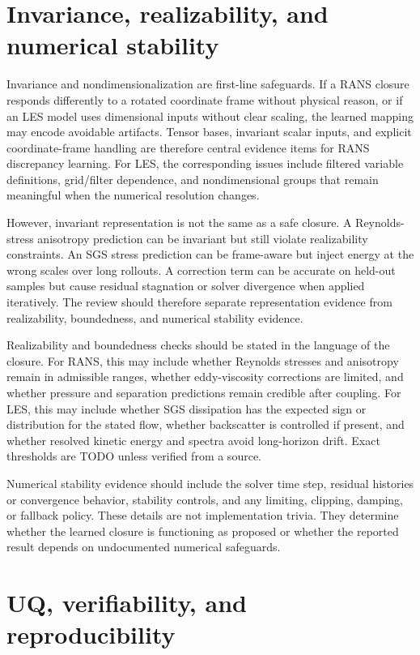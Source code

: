 \documentclass[11pt]{article}
\begin{document}
\section{Invariance, realizability, and numerical stability}

Invariance and nondimensionalization are first-line safeguards. If a RANS closure responds differently to a rotated coordinate frame without physical reason, or if an LES model uses dimensional inputs without clear scaling, the learned mapping may encode avoidable artifacts. Tensor bases, invariant scalar inputs, and explicit coordinate-frame handling are therefore central evidence items for RANS discrepancy learning. For LES, the corresponding issues include filtered variable definitions, grid/filter dependence, and nondimensional groups that remain meaningful when the numerical resolution changes.

However, invariant representation is not the same as a safe closure. A Reynolds-stress anisotropy prediction can be invariant but still violate realizability constraints. An SGS stress prediction can be frame-aware but inject energy at the wrong scales over long rollouts. A correction term can be accurate on held-out samples but cause residual stagnation or solver divergence when applied iteratively. The review should therefore separate representation evidence from realizability, boundedness, and numerical stability evidence.

Realizability and boundedness checks should be stated in the language of the closure. For RANS, this may include whether Reynolds stresses and anisotropy remain in admissible ranges, whether eddy-viscosity corrections are limited, and whether pressure and separation predictions remain credible after coupling. For LES, this may include whether SGS dissipation has the expected sign or distribution for the stated flow, whether backscatter is controlled if present, and whether resolved kinetic energy and spectra avoid long-horizon drift. Exact thresholds are TODO unless verified from a source.

Numerical stability evidence should include the solver time step, residual histories or convergence behavior, stability controls, and any limiting, clipping, damping, or fallback policy. These details are not implementation trivia. They determine whether the learned closure is functioning as proposed or whether the reported result depends on undocumented numerical safeguards.

\section{UQ, verifiability, and reproducibility}
\end{document}
